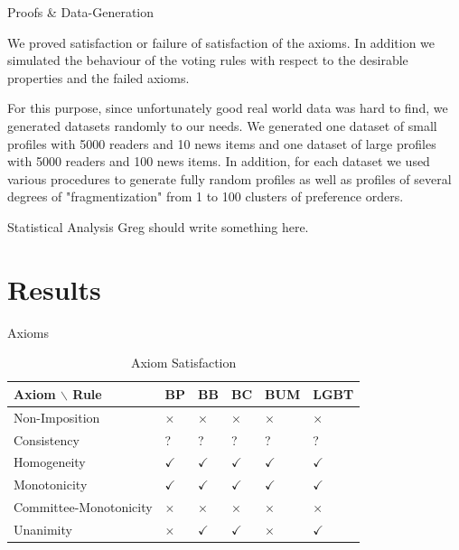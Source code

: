 \documentclass{beamer}
\begin{document}
\begin{frame}{Proofs \& Data-Generation}

We proved satisfaction or failure of satisfaction of the axioms. In addition we simulated the behaviour of the voting rules with respect to the desirable properties and the failed axioms. 

For this purpose, since unfortunately good real world data was hard to find, we generated datasets randomly to our needs. We generated one dataset of small profiles with 5000 readers and 10 news items and one dataset of large profiles with 5000 readers and 100 news items. In addition, for each dataset we used various procedures to generate fully random profiles as well as profiles of several degrees of "fragmentization" from 1 to 100 clusters of preference orders.

\end{frame}

\begin{frame}{Statistical Analysis}
	Greg should write something here.
\end{frame}

\section{Results}

\begin{frame}{Axioms}
	
	\begin{table}[]
		\centering
		\caption{Axiom Satisfaction}
		\label{my-label}
		\begin{tabular}{|l|l|l|l|l|l|}
			\hline
			Axiom $\backslash$ Rule  & BP       & BB       & BC        & BUM       & LGBT \\ \hline
			Non-Imposition         & $\times$ & $\times$ & $\times$  & $\times$  & $\times$  \\ \hline
			Consistency            & ?        & ?        & ?         & ?         & ?         \\ \hline
			Homogeneity        & $\checkmark$ & $\checkmark$  & $\checkmark$   & $\checkmark$ & $\checkmark$ \\ \hline
			Monotonicity     & $\checkmark$  & $\checkmark$  & $\checkmark$ & $\checkmark$   & $\checkmark$ \\ \hline
			Committee-Monotonicity & $\times$  & $\times$      & $\times$     & $\times$      & $\times$  \\ \hline
			Unanimity              & $\times$  & $\checkmark$  & $\checkmark$ & $\times$      & $\checkmark$ \\ \hline
		\end{tabular}
	\end{table}
\end{frame}
\end{document}
